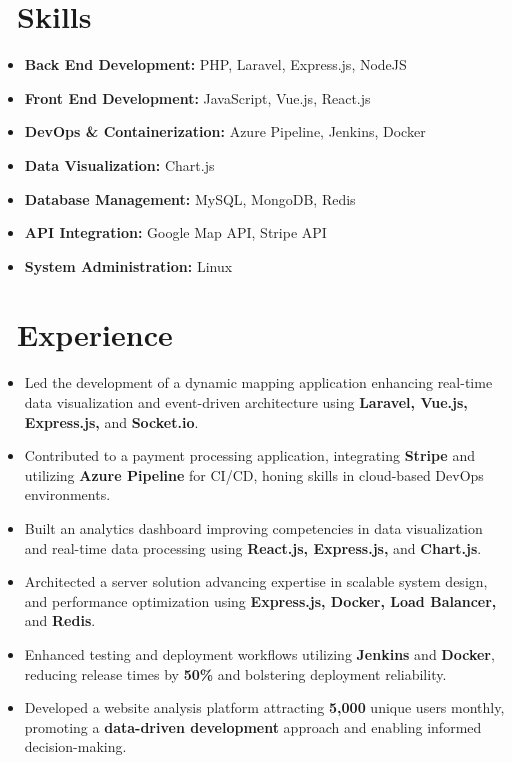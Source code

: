 \documentclass{resume}
\begin{document}



\section{\faCogs\ Skills}
\begin{itemize}[parsep=0.5ex]
  \item \textbf{Back End Development:} PHP, Laravel, Express.js, NodeJS
  \item \textbf{Front End Development:} JavaScript, Vue.js, React.js
  \item \textbf{DevOps \& Containerization:} Azure Pipeline, Jenkins, Docker
  \item \textbf{Data Visualization:} Chart.js
  \item \textbf{Database Management:} MySQL, MongoDB, Redis
  \item \textbf{API Integration:} Google Map API, Stripe API
  \item \textbf{System Administration:} Linux
\end{itemize}


\section{\faUsers\ Experience}
\role{Software Developer}{Full-time}
\begin{itemize}
 \item Led the development of a dynamic mapping application enhancing real-time data visualization and event-driven architecture using \textbf{Laravel, Vue.js, Express.js,} and \textbf{Socket.io}.
 \item Contributed to a payment processing application, integrating \textbf{Stripe} and utilizing \textbf{Azure Pipeline} for CI/CD, honing skills in cloud-based DevOps environments.
 \item Built an analytics dashboard improving competencies in data visualization and real-time data processing using \textbf{React.js, Express.js,} and \textbf{Chart.js}.
 \item Architected a server solution advancing expertise in scalable system design, and performance optimization using \textbf{Express.js, Docker, Load Balancer,} and \textbf{Redis}.
 \item Enhanced testing and deployment workflows utilizing \textbf{Jenkins} and \textbf{Docker}, reducing release times by \textbf{50\%} and bolstering deployment reliability.
 \item Developed a website analysis platform attracting \textbf{5,000} unique users monthly, promoting a \textbf{data-driven development} approach and enabling informed decision-making.
\end{itemize}
\end{document}

